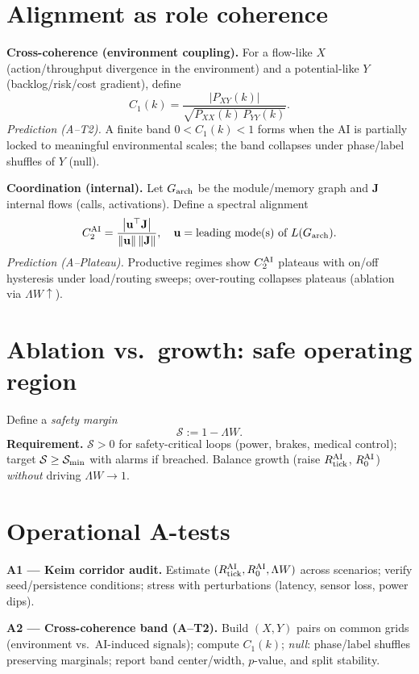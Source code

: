 \documentclass[12pt,a4paper,oneside]{scrreprt}
\begin{document}
\section{Alignment as role coherence}\label{sec:ai-alignment}
\textbf{Cross-coherence (environment coupling).}
For a flow-like $X$ (action/throughput divergence in the environment) and a potential-like $Y$ (backlog/risk/cost gradient), define
\[
C_1(k)=\frac{|P_{XY}(k)|}{\sqrt{P_{XX}(k)\,P_{YY}(k)}}.
\]
\emph{Prediction (A–T2).} A finite band $0<C_1(k)<1$ forms when the AI is partially locked to meaningful environmental scales; the band collapses under phase/label shuffles of $Y$ (null).

\textbf{Coordination (internal).}
Let $G_{\rm arch}$ be the module/memory graph and $\mathbf J$ internal flows (calls, activations). 
Define a spectral alignment
\[
C_2^{\rm AI}=\frac{\big|\mathbf u^\top \mathbf J\big|}{\|\mathbf u\|\,\|\mathbf J\|},\quad 
\mathbf u=\text{leading mode(s) of }L(G_{\rm arch}).
\]
\emph{Prediction (A–Plateau).} Productive regimes show $C_2^{\rm AI}$ plateaus with on/off hysteresis under load/routing sweeps; over-routing collapses plateaus (ablation via $\Lambda W\uparrow$).

\section{Ablation vs.\ growth: safe operating region}\label{sec:ai-ablation}
Define a \emph{safety margin} 
\[
\mathcal S := 1 - \Lambda W.
\]
\textbf{Requirement.} $\mathcal S>0$ for safety-critical loops (power, brakes, medical control); target $\mathcal S\ge \mathcal S_{\rm min}$ with alarms if breached. 
Balance growth (raise $R_{\rm tick}^{\rm AI}$, $R_0^{\rm AI}$) \emph{without} driving $\Lambda W\to 1$.

\section{Operational A-tests}\label{sec:ai-tests}
\textbf{A1 — Keim corridor audit.}
Estimate $(R_{\rm tick}^{\rm AI}, R_0^{\rm AI}, \Lambda W)$ across scenarios; verify seed/persistence conditions; stress with perturbations (latency, sensor loss, power dips).

\textbf{A2 — Cross-coherence band (A–T2).}
Build $(X,Y)$ pairs on common grids (environment vs.\ AI-induced signals); compute $C_1(k)$; \emph{null}: phase/label shuffles preserving marginals; report band center/width, $p$-value, and split stability.
\end{document}
